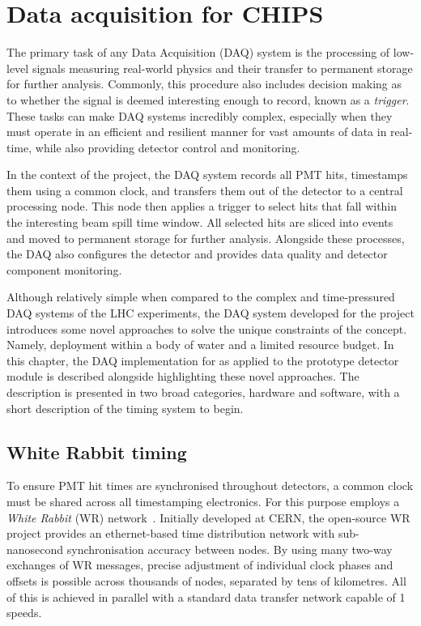 \chapter{Data acquisition for CHIPS} %
\label{chap:daq} %

The primary task of any Data Acquisition (DAQ) system is the processing of low-level signals
measuring real-world physics and their transfer to permanent storage for further analysis.
Commonly, this procedure also includes decision making as to whether the signal is deemed
interesting enough to record, known as a \emph{trigger}. These tasks can make DAQ systems
incredibly complex, especially when they must operate in an efficient and resilient manner for
vast amounts of data in real-time, while also providing detector control and monitoring.

In the context of the \chips project, the DAQ system records all PMT hits, timestamps them using a
common clock, and transfers them out of the detector to a central processing node. This node then
applies a trigger to select hits that fall within the interesting beam spill time window. All
selected hits are sliced into events and moved to permanent storage for further analysis.
Alongside these processes, the DAQ also configures the detector and provides data quality and
detector component monitoring.

Although relatively simple when compared to the complex and time-pressured DAQ systems of the LHC
experiments, the DAQ system developed for the \chips project introduces some novel approaches to
solve the unique constraints of the \chips concept. Namely, deployment within a body of water and
a limited resource budget. In this chapter, the DAQ implementation for \chips as applied to the
\chipsfive prototype detector module is described alongside highlighting these novel approaches.
The description is presented in two broad categories, hardware and software, with a short
description of the timing system to begin.

\section{White Rabbit timing} %
\label{sec:daq_timing} %

To ensure PMT hit times are synchronised throughout \chips detectors, a common clock must be
shared across all timestamping electronics. For this purpose \chips employs a \emph{White Rabbit}
(WR) network~\cite{lipinski2011}. Initially developed at CERN, the open-source WR project provides
an ethernet-based time distribution network with sub-nanosecond synchronisation accuracy between
nodes. By using many two-way exchanges of WR messages, precise adjustment of individual clock
phases and offsets is possible across thousands of nodes, separated by tens of kilometres. All of
this is achieved in parallel with a standard data transfer network capable of
\unit{1}{} speeds.

